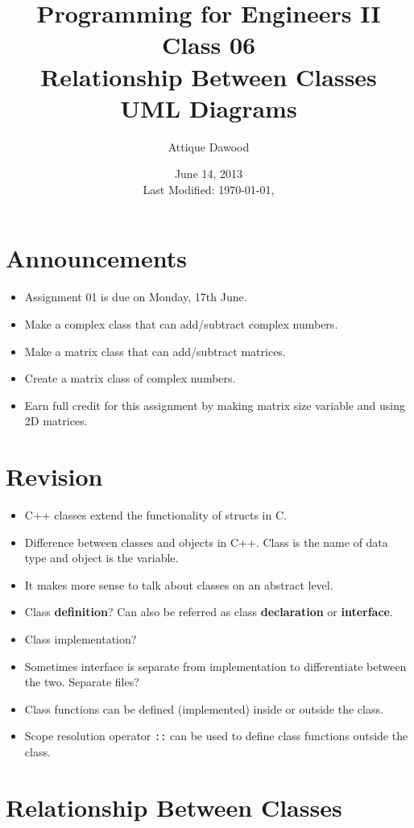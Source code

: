 \documentclass[12pt,a4paper]{article}
\title{\vspace{-2cm}Programming for Engineers II\\Class 06\\Relationship Between Classes\\UML Diagrams}
\author{Attique Dawood}
\date{June 14, 2013\\[0.2cm] Last Modified: \today, \currenttime}
\begin{document}
\maketitle
\section{Announcements}
\begin{itemize}
\item Assignment 01 is due on Monday, 17th June.
\item Make a complex class that can add/subtract complex numbers.
\item Make a matrix class that can add/subtract matrices.
\item Create a matrix class of complex numbers.
\item Earn full credit for this assignment by making matrix size variable and using 2D matrices.
\end{itemize}
\section{Revision}
\begin{itemize}
\item C++ classes extend the functionality of structs in C.
\item Difference between classes and objects in C++. Class is the name of data type and object is the variable.
\item It makes more sense to talk about classes on an abstract level.
\item Class \textbf{definition}? Can also be referred as class \textbf{declaration} or \textbf{interface}.
\item Class implementation?
\item Sometimes interface is separate from implementation to differentiate between the two. Separate files?
\item Class functions can be defined (implemented) inside or outside the class.
\item Scope resolution operator \verb|::| can be used to define class functions outside the class.
\end{itemize}
\section{Relationship Between Classes}
\end{document}
